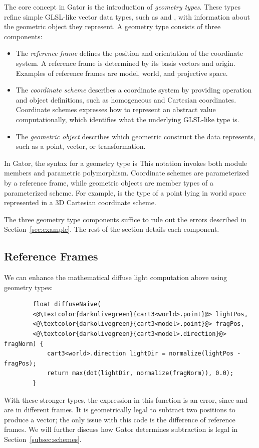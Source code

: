 \documentclass[../main.tex]{subfiles}
\begin{document}
	The core concept in Gator is the introduction of \emph{geometry types}.
	These types refine simple GLSL-like vector data types, such as  and , with information about the geometric object they represent.
	A geometry type consists of three components:
	\begin{itemize}
		\item The \emph{reference frame} defines the position and orientation of the coordinate system. A reference frame is determined by its basis vectors and origin. Examples of reference frames are model, world, and projective space. 
		\item The \emph{coordinate scheme} describes a coordinate system by providing operation and object definitions, such as homogeneous and Cartesian coordinates. Coordinate schemes expresses how to represent an abstract value computationally, which identifies what the underlying GLSL-like type is.
		\item The \emph{geometric object} describes which geometric construct the data represents, such as a point, vector, or transformation.
	\end{itemize}
	In Gator, the syntax for a geometry type is 
	This notation invokes both module members and parametric polymorphism.
	Coordinate schemes are parameterized by a reference frame, while geometric objects are member types of a parameterized scheme.
	For example,  is the type of a point lying in world space represented in a 3D Cartesian coordinate scheme.
	
	The three geometry type components suffice to rule out the errors described in Section~\ref{sec:example}.
	The rest of the section details each component. 
	
	\subsection{Reference Frames}
	\label{subsec:geotypes}
	We can enhance the mathematical diffuse light computation above using geometry types:
	\begin{lstlisting}
		float diffuseNaive(
		<@\textcolor{darkolivegreen}{cart3<world>.point}@> lightPos, 
		<@\textcolor{darkolivegreen}{cart3<model>.point}@> fragPos, 
		<@\textcolor{darkolivegreen}{cart3<model>.direction}@> fragNorm) {
			cart3<world>.direction lightDir = normalize(lightPos - fragPos);
			return max(dot(lightDir, normalize(fragNorm)), 0.0);
		}
	\end{lstlisting}
	With these stronger types, the expression  in this function is an error, since  and  are in different frames. 
	It is geometrically legal to subtract two positions to produce a vector; the only issue with this code is the difference of reference frames.  
	We will further discuss how Gator determines subtraction is legal in Section~\ref{subsec:schemes}.
	
\end{document}
